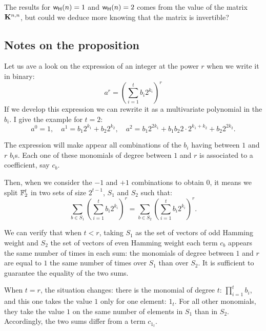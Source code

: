 \documentclass[11pt]{llncs}
\begin{document}
The results for $\mathsf{w_H}(n)=1$ and $\mathsf{w_H}(n)=2$ comes from the value of the matrix $\mathbf{K}^{n,n}$, but could we deduce more knowing that the matrix is invertible?






\subsection{Notes on the proposition}

Let us ave a look on the expression of an integer at the power $r$ when we write it in binary:
\[a^r=(\sum_{i=1}^{t} b_i 2^{k_i})^r\]
If we develop this expression we can rewrite it as a multivariate polynomial in the $b_i$.
I give the example for $t=2$:
\[a^0=1, \quad a^1= b_1 2^{k_1}+ b_2 2^{k_2},\quad a^2= b_1 2^{2k_1} + b_1 b_2 2\cdot  2^{k_1+k_2} + b_2 2^{2k_2}.\]

The expression will make appear all combinations of the $b_i$ having between $1$ and $r$ $b_i$s. Each one of these monomials of degree between $1$ and $r$ is associated to a coefficient, say $c_b$.

Then, when we consider the $-1$ and $+1$ combinations to obtain $0$, it means we split $\mathbb{F}_2^t$ in two sets of size $2^{t-1}$, $S_1$ and $S_2$ such that:
\[\sum_{b\in S_1} (\sum_{i=1}^{t} b_i 2^{k_i})^r =  \sum_{b\in S_2} (\sum_{i=1}^{t} b_i 2^{k_i})^r.\]

We can verify that when $t<r$, taking $S_1$ as the set of vectors of odd Hamming weight and $S_2$ the set of vectors of even Hamming weight each term $c_b$ appears the same number of times in each sum: the monomials of degree between $1$ and $r$ are equal to $1$ the same number of times over $S_1$ than over $S_2$. It is sufficient to guarantee the equality of the two sums.

When $t=r$, the situation changes: there is the monomial of degree $t$: $\prod_{i=1}^t b_i$, and this one takes the value $1$ only for one element: $1_t$. For all other monomials, they take the value $1$ on the same number of elements in $S_1$ than in $S_2$.
Accordingly, the two sums differ from a term $c_{1_t}$.
\end{document}
